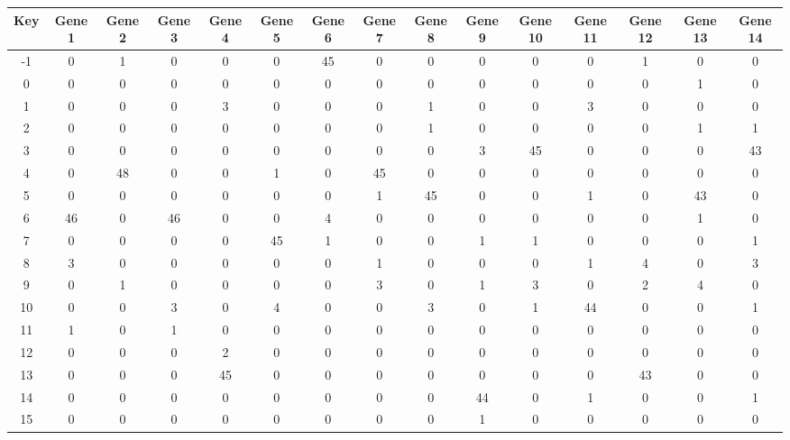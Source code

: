 \begin{tabular}{|c|c|c|c|c|c|c|c|c|c|c|c|c|c|c|}
\hline
Key & Gene 1 & Gene 2 & Gene 3 & Gene 4 & Gene 5 & Gene 6 & Gene 7 & Gene 8 & Gene 9 & Gene 10 & Gene 11 & Gene 12 & Gene 13 & Gene 14 \\
\hline
-1 & 0 & 1 & 0 & 0 & 0 & 45 & 0 & 0 & 0 & 0 & 0 & 1 & 0 & 0 \\
0 & 0 & 0 & 0 & 0 & 0 & 0 & 0 & 0 & 0 & 0 & 0 & 0 & 1 & 0 \\
1 & 0 & 0 & 0 & 3 & 0 & 0 & 0 & 1 & 0 & 0 & 3 & 0 & 0 & 0 \\
2 & 0 & 0 & 0 & 0 & 0 & 0 & 0 & 1 & 0 & 0 & 0 & 0 & 1 & 1 \\
3 & 0 & 0 & 0 & 0 & 0 & 0 & 0 & 0 & 3 & 45 & 0 & 0 & 0 & 43 \\
4 & 0 & 48 & 0 & 0 & 1 & 0 & 45 & 0 & 0 & 0 & 0 & 0 & 0 & 0 \\
5 & 0 & 0 & 0 & 0 & 0 & 0 & 1 & 45 & 0 & 0 & 1 & 0 & 43 & 0 \\
6 & 46 & 0 & 46 & 0 & 0 & 4 & 0 & 0 & 0 & 0 & 0 & 0 & 1 & 0 \\
7 & 0 & 0 & 0 & 0 & 45 & 1 & 0 & 0 & 1 & 1 & 0 & 0 & 0 & 1 \\
8 & 3 & 0 & 0 & 0 & 0 & 0 & 1 & 0 & 0 & 0 & 1 & 4 & 0 & 3 \\
9 & 0 & 1 & 0 & 0 & 0 & 0 & 3 & 0 & 1 & 3 & 0 & 2 & 4 & 0 \\
10 & 0 & 0 & 3 & 0 & 4 & 0 & 0 & 3 & 0 & 1 & 44 & 0 & 0 & 1 \\
11 & 1 & 0 & 1 & 0 & 0 & 0 & 0 & 0 & 0 & 0 & 0 & 0 & 0 & 0 \\
12 & 0 & 0 & 0 & 2 & 0 & 0 & 0 & 0 & 0 & 0 & 0 & 0 & 0 & 0 \\
13 & 0 & 0 & 0 & 45 & 0 & 0 & 0 & 0 & 0 & 0 & 0 & 43 & 0 & 0 \\
14 & 0 & 0 & 0 & 0 & 0 & 0 & 0 & 0 & 44 & 0 & 1 & 0 & 0 & 1 \\
15 & 0 & 0 & 0 & 0 & 0 & 0 & 0 & 0 & 1 & 0 & 0 & 0 & 0 & 0 \\
\hline
\end{tabular}